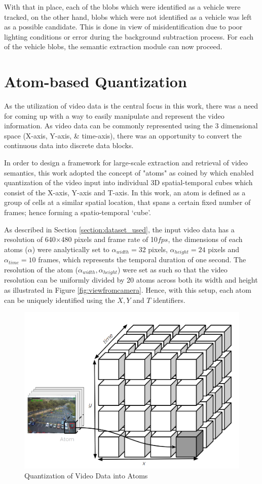 With that in place, each of the blobs which were identified as a vehicle were tracked, on the other hand, blobs which were not identified as a vehicle was left as a possible candidate. This is done in view of misidentification due to poor lighting conditions or error during the background subtraction process. For each of the vehicle blobs, the semantic extraction module can now proceed.  


\section{Atom-based Quantization}
\label{section:dbschema}

As the utilization of video data is the central focus in this work, there was a need for coming up with a way to easily manipulate and represent the video information. As video data can be commonly represented using the 3 dimensional space (X-axis, Y-axis, \& time-axis), there was an opportunity to convert the continuous data into discrete data blocks.     


In order to design a framework for large-scale extraction and retrieval of video semantics, this work adopted the concept of "atoms" as coined by \cite{castanon2016retrieval} which enabled quantization of the video input into individual 3D spatial-temporal cubes which consist of the X-axis, Y-axis and T-axis. In this work, an atom is defined as a group of cells at a similar spatial location, that spans a certain fixed number of frames; hence forming a spatio-temporal `cube'.

As described in Section \ref{section:dataset_used}, the input video data has a resolution of 640$\times$480 pixels and frame rate of 10$fps$, the dimensions of each atoms ($\alpha$) were analytically set to $\alpha_{width}=32$ pixels, $\alpha_{height}=24$ pixels and $\alpha_{time}=10$ frames, which represents the temporal duration of one second. The resolution of the atom ($\alpha_{width},\alpha_{height}$) were set as such so that the video resolution can be uniformly divided by 20 atoms across both its width and height as illustrated in Figure \ref{fig:viewfromcamera}. Hence, with this setup, each atom can be uniquely identified using the $X, Y$ and $T$ identifiers.



\begin{figure}[hbt!]\centering
\includegraphics[width=.7\textwidth]{image/general/atom.PNG}
\caption{Quantization of Video Data into Atoms}
\label{fig:atoms}
\end{figure}

